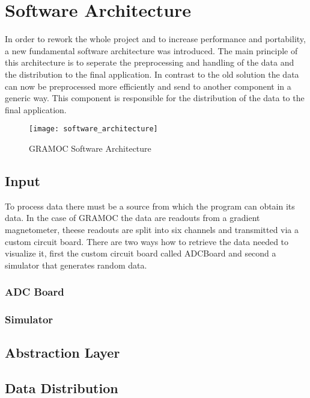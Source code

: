 \chapter{Software Architecture}
\label{ch:Software_Architecture}

In order to rework the whole project and to increase performance and portability, a new fundamental software architecture was introduced. The main principle of this architecture is to seperate the preprocessing and handling of the data and the distribution to the final application. In contrast to the old solution the data can now be preprocessed more efficiently and send to another component in a generic way. This component is responsible for the distribution of the data to the final application.

\begin{figure}[H]
    \centering
    \texttt{[image: software\_architecture]}
    \caption{GRAMOC Software Architecture}
    \label{fig:software_architecture}
\end{figure}

\section{Input}

To process data there must be a source from which the program can obtain its data. In the case of GRAMOC the data are readouts from a gradient magnetometer, theese readouts are split into six channels and transmitted via a custom circuit board. There are two ways how to retrieve the data needed to visualize it, first the custom circuit board called ADCBoard and second a simulator that generates random data.

\subsection{ADC Board}

\subsection{Simulator}

\section{Abstraction Layer}


\section{Data Distribution}
